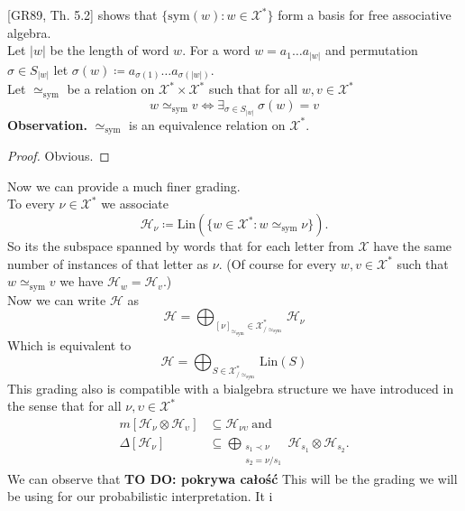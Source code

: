 \documentclass[a4paper, 12pt]{report}
\newcommand{\todo}[1]{\hfill \break \textbf{\Huge TO DO: #1 \hfill \break}\normalsize}
\newcommand{\SimeqSym}{{\simeq_\mathrm{sym}}}
\begin{document}
[GR89, Th. 5.2] shows that $\{\mathrm{sym}(w) : w \in \mathcal{X^*}\}$ form a basis for free associative 
algebra. \\
Let $|w|$ be the length of word $w$. For a word $w = a_1\dots a_{|w|}$ and permutation 
$\sigma \in S_{|w|}$ let $\sigma(w) \coloneqq a_{\sigma(1)}\dots a_{\sigma(|w|)}$. \\ 
Let $\simeq_\mathrm{sym}$ be 
a relation on $\mathcal{X}^* \times \mathcal{X}^*$ such that for all $w, v \in \mathcal{X}^*$ 
\begin{equation*}
w \simeq_\mathrm{sym} v \iff \exists_{\sigma \in S_{|w|}}\ \sigma(w) = v
\end{equation*}
\textbf{Observation.} $\simeq_\mathrm{sym}$ is an equivalence relation on $\mathcal{X}^*$.
\begin{proof}
Obvious.
\end{proof}
\noindent Now we can provide a much finer grading. \\
To every $\nu \in \mathcal{X}^*$ we associate
\begin{equation}
\mathcal{H}_\nu \coloneqq \mathrm{Lin}(\{w \in \mathcal{X}^* : w \SimeqSym \nu\}).
\end{equation}
So its the subspace spanned by words that for each letter from $\mathcal{X}$ have the same number of 
instances of that letter as 
$\nu$. (Of course for every $w, v \in \mathcal{X}^*$ such that $w \SimeqSym v$ we have 
$\mathcal{H}_w = \mathcal{H}_v$.) \\
Now we can write $\mathcal{H}$ as 
\begin{equation*}
\mathcal{H} = \bigoplus_{{[\nu]}_\SimeqSym \in \mathcal{X}^*_{/\SimeqSym}} \mathcal{H}_\nu
\end{equation*}
Which is equivalent to
\begin{equation*}
\mathcal{H} = \bigoplus_{S \in \mathcal{X}^*_{/\SimeqSym}} \mathrm{Lin}(S)
\end{equation*}
This grading also is compatible with a bialgebra structure we have introduced in the sense that for all 
$\nu, \upsilon \in \mathcal{X}^*$
\begin{align*}
m[\mathcal{H}_\nu \otimes \mathcal{H}_\upsilon] &\subseteq \mathcal{H}_{\nu\upsilon} \mathrm{\ and} \\
\Delta[\mathcal{H}_\nu] &\subseteq \bigoplus_{\substack{s_1 \prec \nu \\ s_2 = \nu/ s_1}} 
\mathcal{H}_{s_1} \otimes \mathcal{H}_{s_2}.
\end{align*}
We can observe that 
\todo{pokrywa całość}
This will be the grading we will be using for our probabilistic interpretation. It i
\end{document}
